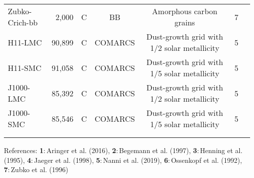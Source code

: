\documentclass[onecolumn]{aastex63}
\begin{document}
\begin{table*}
\begin{tabular}{ l r c c c c c}
    Zubko-Crich-bb & 2,000 & C & BB & Amorphous carbon grains &  7\\
    \vspace{0.1cm}
    H11-LMC & 90,899 & C & COMARCS & Dust-growth grid with 1/2 solar metallicity &  5\\
    \vspace{0.1cm}
    H11-SMC & 91,058 & C & COMARCS & Dust-growth grid with 1/5 solar metallicity &  5\\
    \vspace{0.1cm}
    J1000-LMC & 85,392 & C & COMARCS & Dust-growth grid with 1/2 solar metallicity &  5\\
    \vspace{0.1cm}
    J1000-SMC & 85,546 & C & COMARCS & Dust-growth grid with 1/5 solar metallicity & 5\\
    \\
    \hline
    \vspace{-0.3cm}
    \end{tabular}
    \begin{flushleft}
    {{References}: \textbf{1}:\,Aringer et al. (2016), \textbf{2}:\,Begemann et al. (1997), \textbf{3}:\,Henning et al. (1995), \textbf{4}:\,Jaeger et al. (1998), \textbf{5}:\,Nanni et al. (2019), \textbf{6}:\,Ossenkopf et al. (1992), \textbf{7}:\,Zubko et al. (1996)}
    \end{flushleft}

\end{table*}

\thispagestyle{empty}
\end{document}
